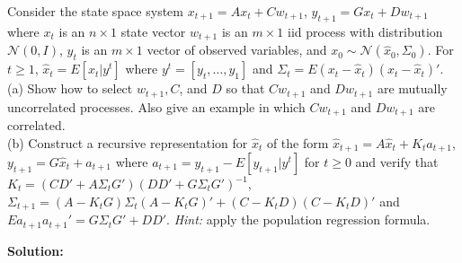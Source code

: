 \documentclass[12pt, letterpaper]{article}
\begin{document}
\begin{tcolorbox}[evenbox,title={Exercise 2.22 \quad Kalman Filter with Cross-Products}]
\begin{tcolorbox}[questionbox]
Consider the state space system $x_{t+1}=Ax_t+Cw_{t+1}$, $y_{t+1}=Gx_t+Dw_{t+1}$ where $x_t$ is an
$n\times1$ state vector $w_{t+1}$ is an $m\times1$ iid process with distribution $\mathcal N(0,I)$, $y_t$
is an $m\times1$ vector of observed variables, and $x_0\sim\mathcal N(\hat x_0,\Sigma_0)$. For $t\ge1$,
$\hat x_t=E[x_t|y^t]$ where $y^t=[y_t,\dots,y_1]$ and $\Sigma_t=E(x_t-\hat x_t)(x_t-\hat x_t)'$.\\[3pt]
(a) Show how to select $w_{t+1},C$, and $D$ so that $Cw_{t+1}$ and $Dw_{t+1}$ are mutually uncorrelated
processes. Also give an example in which $Cw_{t+1}$ and $Dw_{t+1}$ are correlated.\\
(b) Construct a recursive representation for $\hat x_t$ of the form
$\hat x_{t+1}=A\hat x_t+K_ta_{t+1}$, $y_{t+1}=G\hat x_t+a_{t+1}$ where $a_{t+1}=y_{t+1}-E[y_{t+1}|y^t]$ for
$t\ge0$ and verify that
$K_t=(CD'+A\Sigma_tG')(DD'+G\Sigma_tG')^{-1}$,
$\Sigma_{t+1}=(A-K_tG)\Sigma_t(A-K_tG)'+(C-K_tD)(C-K_tD)'$ and $Ea_{t+1}a_{t+1}'=G\Sigma_tG'+DD'$.
\textit{Hint:} apply the population regression formula.
\end{tcolorbox}

\textbf{Solution:}


\end{tcolorbox}
\end{document}
